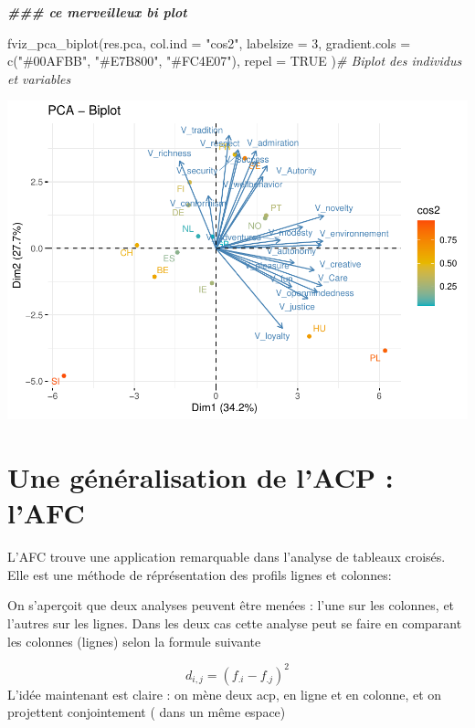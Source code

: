 \documentclass[
]{book}
\newenvironment{Shaded}{\begin{snugshade}}{\end{snugshade}}
\newcommand{\AttributeTok}[1]{\textcolor[rgb]{0.77,0.63,0.00}{#1}}
\newcommand{\CommentTok}[1]{\textcolor[rgb]{0.56,0.35,0.01}{\textit{#1}}}
\newcommand{\ConstantTok}[1]{\textcolor[rgb]{0.00,0.00,0.00}{#1}}
\newcommand{\DecValTok}[1]{\textcolor[rgb]{0.00,0.00,0.81}{#1}}
\newcommand{\DocumentationTok}[1]{\textcolor[rgb]{0.56,0.35,0.01}{\textbf{\textit{#1}}}}
\newcommand{\FunctionTok}[1]{\textcolor[rgb]{0.00,0.00,0.00}{#1}}
\newcommand{\NormalTok}[1]{#1}
\newcommand{\StringTok}[1]{\textcolor[rgb]{0.31,0.60,0.02}{#1}}
\begin{document}
\begin{Shaded}
\begin{Highlighting}[]
\DocumentationTok{\#\#\# ce merveilleux bi plot}

\FunctionTok{fviz\_pca\_biplot}\NormalTok{(res.pca, }\AttributeTok{col.ind =} \StringTok{"cos2"}\NormalTok{, }\AttributeTok{labelsize =} \DecValTok{3}\NormalTok{,}
             \AttributeTok{gradient.cols =} \FunctionTok{c}\NormalTok{(}\StringTok{"\#00AFBB"}\NormalTok{, }\StringTok{"\#E7B800"}\NormalTok{, }\StringTok{"\#FC4E07"}\NormalTok{),}
             \AttributeTok{repel =} \ConstantTok{TRUE}\NormalTok{ )}\CommentTok{\# Biplot des individus et variables}
\end{Highlighting}
\end{Shaded}

\includegraphics{bookdown-demo_files/figure-latex/0609-4.pdf}

\hypertarget{une-guxe9nuxe9ralisation-de-lacp-lafc}{%
\section{Une généralisation de l'ACP : l'AFC}\label{une-guxe9nuxe9ralisation-de-lacp-lafc}}

L'AFC trouve une application remarquable dans l'analyse de tableaux croisés. Elle est une méthode de réprésentation des profils lignes et colonnes:

On s'aperçoit que deux analyses peuvent être menées : l'une sur les colonnes, et l'autres sur les lignes. Dans les deux cas cette analyse peut se faire en comparant les colonnes (lignes) selon la formule suivante

\[
d_{i,j}= (f_{.i}-f_{.j})^2
\]
L'idée maintenant est claire : on mène deux acp, en ligne et en colonne, et on projettent conjointement ( dans un même espace)
\end{document}
